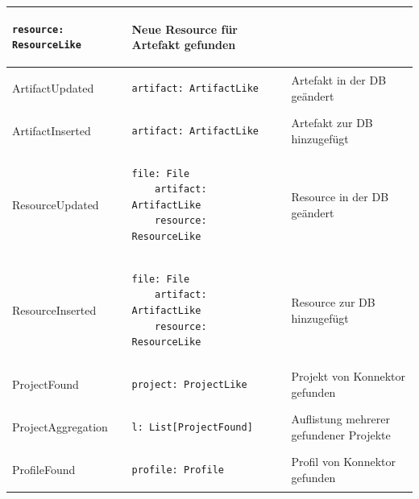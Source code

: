 \begin{table}
\begin{tabular}{|l|l|p{4.8cm}|}
\begin{lstlisting}[gobble=4]
    resource: ResourceLike
    \end{lstlisting} & Neue Resource für Artefakt gefunden                        \\ \hline
    ArtifactUpdated     & \begin{lstlisting}[gobble=4]
    artifact: ArtifactLike
    \end{lstlisting}                                                   & Artefakt in der DB geändert                                \\ \hline
    ArtifactInserted    & \begin{lstlisting}[gobble=4]
    artifact: ArtifactLike    
    \end{lstlisting}                                               & Artefakt zur DB hinzugefügt                                \\ \hline
    ResourceUpdated     & \begin{lstlisting}[gobble=4]
    file: File
    artifact: ArtifactLike
    resource: ResourceLike
    \end{lstlisting}               & Resource in der DB geändert                                \\ \hline
    ResourceInserted    & \begin{lstlisting}[gobble=4]
    file: File
    artifact: ArtifactLike
    resource: ResourceLike
    \end{lstlisting}               & Resource zur DB hinzugefügt                                \\ \hline
    ProjectFound        & \begin{lstlisting}[gobble=4]
    project: ProjectLike
    \end{lstlisting}                                                     & Projekt von Konnektor gefunden                             \\ \hline
    ProjectAggregation  & \begin{lstlisting}[gobble=4]
    l: List[ProjectFound]      
    \end{lstlisting}                                               & Auflistung mehrerer gefundener Projekte                    \\ \hline
    ProfileFound        & \begin{lstlisting}[gobble=4]
    profile: Profile   
    \end{lstlisting}                                                       & Profil von Konnektor gefunden                              \\ \hline

\end{tabular}
\end{table}
